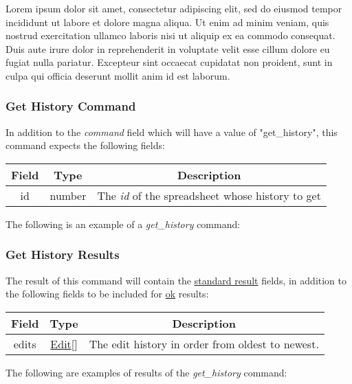 Lorem ipsum dolor sit amet, consectetur adipiscing elit, sed do eiusmod tempor incididunt ut labore et dolore magna aliqua. Ut enim ad minim veniam, quis nostrud exercitation ullamco laboris nisi ut aliquip ex ea commodo consequat. Duis aute irure dolor in reprehenderit in voluptate velit esse cillum dolore eu fugiat nulla pariatur. Excepteur sint occaecat cupidatat non proident, sunt in culpa qui officia deserunt mollit anim id est laborum.

\subsubsection{Get History Command}
In addition to the \emph{command} field which will have a value of "get\_history", this command expects the following fields:
\begin{table}[H]
    \begin{center}
        \begin{tabular}{|c|c|c|}\hline
            Field & Type & Description \\\hline
            id & number & The \emph{id} of the spreadsheet whose history to get \\\hline
        \end{tabular}
    \end{center}
\end{table}

The following is an example of a \emph{get\_history} command:


\subsubsection{Get History Results}
The result of this command will contain the \hyperref[sec:message:result]{standard result} fields, in addition to the following fields to be included for \underline{ok} results:
\begin{table}[H]
    \begin{center}
        \begin{tabular}{|c|c|c|}\hline
            Field & Type & Description \\\hline
            edits & \hyperref[sec:message:edits]{Edit}[] & The edit history in order from oldest to newest. \\\hline
        \end{tabular}
    \end{center}
\end{table}

The following are examples of results of the \emph{get\_history} command:



